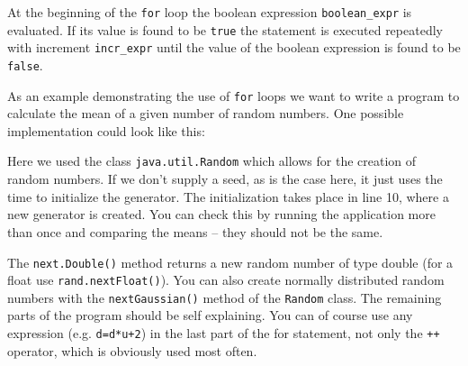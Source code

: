 At the beginning of the \verb|for| loop the boolean expression
\verb|boolean_expr| is evaluated. If its value is found to be 
\verb|true| the statement is executed repeatedly with increment
\verb|incr_expr| until the value of the boolean expression is found to
be \verb|false|.

As an example demonstrating the use of
\verb|for| loops we want to write a program to calculate the mean of
a given number of random numbers. One possible implementation
could look like this:

Here we used the class \verb|java.util.Random| which allows for
the creation of random numbers. If we don't supply a seed, as is the
case here, it just uses the time to initialize the generator. The
initialization takes place in line 10, where a new generator is created.
You can check this by running the application more than once and comparing
the means -- they should not be the same. 

The \verb|next.Double()| method returns a new random number of type
double (for a float use \verb|rand.nextFloat()|). You can also create normally 
distributed random numbers with the \verb|nextGaussian()| method of
the \verb|Random| class.
The remaining parts of the program should be self explaining. You can of
course use any expression (e.g. \verb|d=d*u+2|) 
in the last part of the for statement, not only
the \verb|++| operator, which is obviously used most often. 

